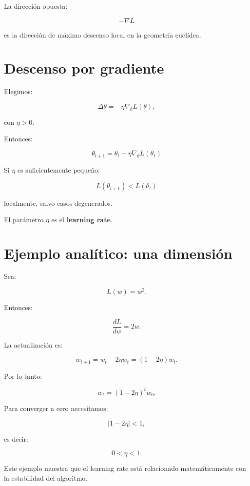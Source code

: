 \documentclass[
  letterpaper,
  DIV=11,
  numbers=noendperiod]{scrartcl}
\begin{document}
La dirección opuesta:

\[
-\nabla L
\]

es la dirección de máximo descenso local en la geometría euclídea.

\section{Descenso por gradiente}\label{descenso-por-gradiente}

Elegimos:

\[
\Delta\theta
=
-\eta\nabla_\theta L(\theta),
\]

con \(\eta>0\).

Entonces:

\[
\boxed{
\theta_{t+1}
=
\theta_t
-
\eta\nabla_\theta L(\theta_t)
}
\]

Si \(\eta\) es suficientemente pequeño:

\[
L(\theta_{t+1})
<
L(\theta_t)
\]

localmente, salvo casos degenerados.

El parámetro \(\eta\) es el \textbf{learning rate}.

\section{Ejemplo analítico: una
dimensión}\label{ejemplo-analuxedtico-una-dimensiuxf3n}

Sea:

\[
L(w)=w^2.
\]

Entonces:

\[
\frac{dL}{dw}=2w.
\]

La actualización es:

\[
w_{t+1}
=
w_t-2\eta w_t
=
(1-2\eta)w_t.
\]

Por lo tanto:

\[
w_t=(1-2\eta)^t w_0.
\]

Para converger a cero necesitamos:

\[
|1-2\eta|<1,
\]

es decir:

\[
\boxed{
0<\eta<1.
}
\]

Este ejemplo muestra que el learning rate está relacionado
matemáticamente con la estabilidad del algoritmo.
\end{document}
